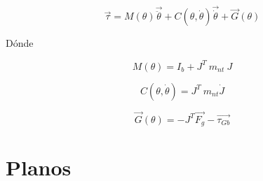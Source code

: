                  \[ \overrightarrow{ \tau}=M \left(  \theta  \right) \overrightarrow{\ddot{ \theta }}+C \left(  \theta ,\dot{ \theta } \right) \overrightarrow{\dot{ \theta }}+ \overrightarrow{G} \left(  \theta  \right)  \] 
                
                Dónde
                
                 \[ M \left(  \theta  \right) =I_{b}+J^{T}~m_{nt}~J \] 
                
                 \[ C \left(  \theta ,\dot{ \theta } \right) =J^{T}~m_{nt}\dot{J} \] 
                
                 \[ \overrightarrow{G} \left(  \theta  \right) =- J^{T}\overrightarrow{F_{g}}-\overrightarrow{ \tau_{Gb}} \] 
         \newpage



        
\chapter{Planos}\label{anexoC}
\thispagestyle{fancy}
    \section{}
        \subsection{}